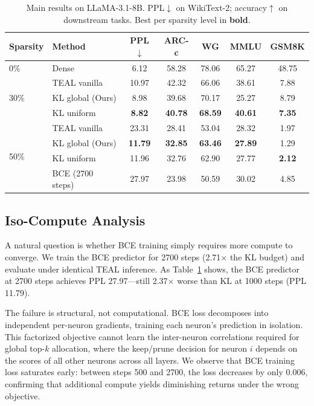 \begin{table}[t]
\centering
\caption{Main results on LLaMA-3.1-8B. PPL$\downarrow$ on WikiText-2; accuracy$\uparrow$ on downstream tasks. Best per sparsity level in \textbf{bold}.}
\label{tab:main}
\small
\begin{tabular}{llccccc}
\toprule
Sparsity & Method & PPL$\downarrow$ & ARC-c & WG & MMLU & GSM8K \\
\midrule
0\% & Dense & 6.12 & 58.28 & 78.06 & 65.27 & 48.75 \\
\midrule
\multirow{3}{*}{30\%}
& TEAL vanilla & 10.97 & 42.32 & 66.06 & 38.61 & 7.88 \\ %
& KL global (Ours) & 8.98 & 39.68 & 70.17 & 25.27 & 8.79 \\ %
& KL uniform & \textbf{8.82} & \textbf{40.78} & \textbf{68.59} & \textbf{40.61} & \textbf{7.35} \\ %
\midrule
\multirow{4}{*}{50\%}
& TEAL vanilla & 23.31 & 28.41 & 53.04 & 28.32 & 1.97 \\ %
& KL global (Ours) & \textbf{11.79} & \textbf{32.85} & \textbf{63.46} & \textbf{27.89} & 1.29 \\ %
& KL uniform & 11.96 & 32.76 & 62.90 & 27.77 & \textbf{2.12} \\ %
& BCE (2700 steps) & 27.97 & 23.98 & 50.59 & 30.02 & 4.85 \\ %
\bottomrule
\end{tabular}
\end{table}


\subsection{Iso-Compute Analysis}
\label{sec:isocompute}

A natural question is whether BCE training simply requires more compute to converge.
We train the BCE predictor for 2700 steps (2.71$\times$ the KL budget) and evaluate under identical TEAL inference.
As Table~\ref{tab:main} shows, the BCE predictor at 2700 steps achieves PPL 27.97—still 2.37$\times$ worse than KL at 1000 steps (PPL 11.79). %

The failure is structural, not computational.
BCE loss decomposes into independent per-neuron gradients, training each neuron's prediction in isolation.
This factorized objective cannot learn the inter-neuron correlations required for global top-$k$ allocation, where the keep/prune decision for neuron $i$ depends on the scores of all other neurons across all layers.
We observe that BCE training loss saturates early: between steps 500 and 2700, the loss decreases by only 0.006, confirming that additional compute yields diminishing returns under the wrong objective.


